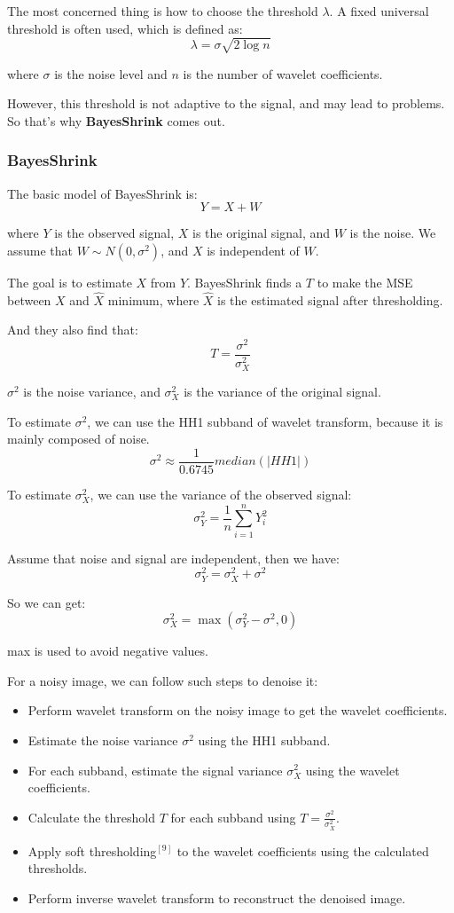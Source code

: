 \documentclass[12pt]{ctexart}
\begin{document}
The most concerned thing is how to choose the threshold $\lambda$. A fixed universal threshold
is often used, which is defined as:
\[
  \lambda = \sigma \sqrt{2 \log n}
\]

where $\sigma$ is the noise level and $n$ is the number of wavelet coefficients.

However, this threshold is not adaptive to the signal, and may lead to problems. So that's
why \textbf{BayesShrink} comes out.

\subsubsection{\textbf{BayesShrink}}

The basic model of BayesShrink is:
\[
  Y = X + W
\]

where $Y$ is the observed signal, $X$ is the original signal, and $W$ is the noise. We
assume that $W \sim N(0, \sigma^2)$, and $X$ is independent of $W$.

The goal is to estimate $X$ from $Y$. BayesShrink finds a $T$ to make the MSE between $X$
and $\hat{X}$ minimum, where $\hat{X}$ is the estimated signal after thresholding.

And they also find that:
\[
  T = \frac{\sigma^2}{\sigma_X^2}
\]

$\sigma^2$ is the noise variance, and $\sigma_X^2$ is the variance of the original signal.

To estimate $\sigma^2$, we can use the HH1 subband of wavelet transform, because it is
mainly composed of noise.
\[
  \sigma^2 \approx \frac{1}{0.6745} median(|HH1|)
\]

To estimate $\sigma_X^2$, we can use the variance of the observed signal:
\[
  \sigma_Y^2 = \frac{1}{n} \sum_{i=1}^{n} Y_i^2
\]

Assume that noise and signal are independent, then we have:
\[
  \sigma_Y^2 = \sigma_X^2 + \sigma^2
\]

So we can get:
\[
  \sigma_X^2 = \max(\sigma_Y^2 - \sigma^2, 0)
\]

max is used to avoid negative values.

For a noisy image, we can follow such steps to denoise it:
\begin{itemize}
  \item Perform wavelet transform on the noisy image to get the wavelet coefficients.
  \item Estimate the noise variance $\sigma^2$ using the HH1 subband.
  \item For each subband, estimate the signal variance $\sigma_X^2$ using the wavelet
  coefficients.
  \item Calculate the threshold $T$ for each subband using $T = \frac{\sigma^2}{\sigma_X^2}$.
  \item Apply soft thresholding$^{[9]}$ to the wavelet coefficients using the calculated thresholds.
  \item Perform inverse wavelet transform to reconstruct the denoised image.
\end{itemize}
\end{document}
